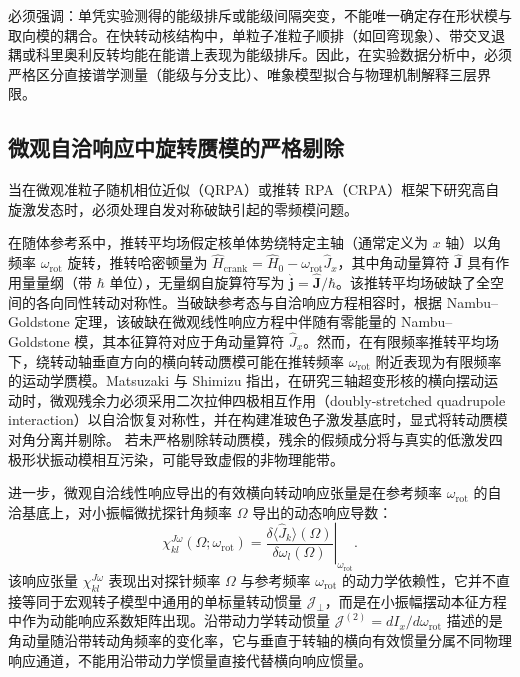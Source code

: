 必须强调：单凭实验测得的能级排斥或能级间隔突变，不能唯一确定存在形状模与取向模的耦合。在快转动核结构中，单粒子准粒子顺排（如回弯现象）、带交叉退耦或科里奥利反转均能在能谱上表现为能级排斥。因此，在实验数据分析中，必须严格区分直接谱学测量（能级与分支比）、唯象模型拟合与物理机制解释三层界限。

\subsection{微观自洽响应中旋转赝模的严格剔除}\label{sec:3-6-4}

当在微观准粒子随机相位近似（QRPA）或推转 RPA（CRPA）框架下研究高自旋激发态时，必须处理自发对称破缺引起的零频模问题。\cite{prochniak-rohozinski-2009-bohr-collective-hamiltonian,matsuzaki-2004-nuclear-inertia-and-wobbling}

在随体参考系中，推转平均场假定核单体势绕特定主轴（通常定义为 $x$ 轴）以角频率 $\omega_{\mathrm{rot}}$ 旋转，推转哈密顿量为 $\hat{H}_{\mathrm{crank}} = \hat{H}_0 - \omega_{\mathrm{rot}} \hat{J}_x$，其中角动量算符 $\hat{\mathbf{J}}$ 具有作用量量纲（带 $\hbar$ 单位），无量纲自旋算符写为 $\hat{\mathbf{j}} = \hat{\mathbf{J}}/\hbar$。该推转平均场破缺了全空间的各向同性转动对称性。当破缺参考态与自洽响应方程相容时，根据 Nambu--Goldstone 定理，该破缺在微观线性响应方程中伴随有零能量的 Nambu--Goldstone 模，其本征算符对应于角动量算符 $\hat{J}_x$。然而，在有限频率推转平均场下，绕转动轴垂直方向的横向转动赝模可能在推转频率 $\omega_{\mathrm{rot}}$ 附近表现为有限频率的运动学赝模。Matsuzaki 与 Shimizu 指出，在研究三轴超变形核的横向摆动运动时，微观残余力必须采用二次拉伸四极相互作用（doubly-stretched quadrupole interaction）以自洽恢复对称性，并在构建准玻色子激发基底时，显式将转动赝模对角分离并剔除。\cite{matsuzaki-2004-nuclear-inertia-and-wobbling} 若未严格剔除转动赝模，残余的假频成分将与真实的低激发四极形状振动模相互污染，可能导致虚假的非物理能带。

进一步，微观自洽线性响应导出的有效横向转动响应张量是在参考频率 $\omega_{\mathrm{rot}}$ 的自洽基底上，对小振幅微扰探针角频率 $\Omega$ 导出的动态响应导数：
\begin{equation}\label{eq:3-6-freq-dependent-inertia}
\chi_{kl}^{J\omega}(\Omega; \omega_{\mathrm{rot}}) = \left. \frac{\delta \langle \hat{J}_k \rangle(\Omega)}{\delta \omega_l(\Omega)} \right|_{\omega_{\mathrm{rot}}} .
\end{equation}
该响应张量 $\chi_{kl}^{J\omega}$ 表现出对探针频率 $\Omega$ 与参考频率 $\omega_{\mathrm{rot}}$ 的动力学依赖性，它并不直接等同于宏观转子模型中通用的单标量转动惯量 $\mathcal{J}_{\perp}$，而是在小振幅摆动本征方程中作为动能响应系数矩阵出现。沿带动力学转动惯量 $\mathcal{J}^{(2)} = dI_x/d\omega_{\mathrm{rot}}$ 描述的是角动量随沿带转动角频率的变化率，它与垂直于转轴的横向有效惯量分属不同物理响应通道，不能用沿带动力学惯量直接代替横向响应惯量。\cite{matsuzaki-2004-nuclear-inertia-and-wobbling}


